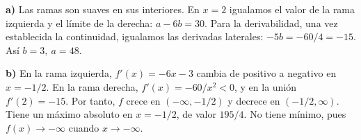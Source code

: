 \textbf{a)} Las ramas son suaves en sus interiores. En $x=2$ igualamos el valor de la rama izquierda y el límite de la derecha: $a-6b=30$. Para la derivabilidad, una vez establecida la continuidad, igualamos las derivadas laterales: $-5b=-60/4=-15$. Así $\boxed{b=3,\ a=48}$.

\textbf{b)} En la rama izquierda, $f'(x)=-6x-3$ cambia de positivo a negativo en $x=-1/2$. En la rama derecha, $f'(x)=-60/x^2<0$, y en la unión $f'(2)=-15$. Por tanto, $f$ crece en $(-\infty,-1/2)$ y decrece en $(-1/2,\infty)$. Tiene un máximo absoluto en $x=-1/2$, de valor $\boxed{195/4}$. No tiene mínimo, pues $f(x)\to-\infty$ cuando $x\to-\infty$.
